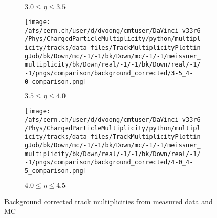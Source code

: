 \begin{figure}[h]
\begin{subfigure}{0.32\textwidth}
		\caption{$3.0 \le \eta \le 3.5$}
	\end{subfigure}
	\begin{subfigure}{0.32\textwidth}
		\texttt{[image: /afs/cern.ch/user/d/dvoong/cmtuser/DaVinci\_v33r6/Phys/ChargedParticleMultiplicity/python/multiplicity/tracks/data\_files/TrackMultiplicityPlottingJob/bk/Down/mc/-1/-1/bk/Down/mc/-1/-1/meissner\_multiplicity/bk/Down/real/-1/-1/bk/Down/real/-1/-1/pngs/comparison/background\_corrected/3-5\_4-0\_comparison.png]}
		\caption{$3.5 \le \eta \le 4.0$}
	\end{subfigure}
	\begin{subfigure}{0.32\textwidth}
		\texttt{[image: /afs/cern.ch/user/d/dvoong/cmtuser/DaVinci\_v33r6/Phys/ChargedParticleMultiplicity/python/multiplicity/tracks/data\_files/TrackMultiplicityPlottingJob/bk/Down/mc/-1/-1/bk/Down/mc/-1/-1/meissner\_multiplicity/bk/Down/real/-1/-1/bk/Down/real/-1/-1/pngs/comparison/background\_corrected/4-0\_4-5\_comparison.png]}
		\caption{$4.0 \le \eta \le 4.5$}
	\end{subfigure}
	\caption{Background corrected track multiplicities from measured data and MC}
	\label{fig: background corrected track multiplicity comparison}
\end{figure}

